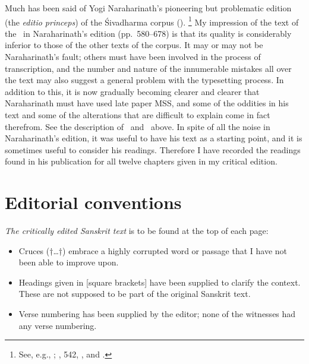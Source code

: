 Much has been said of Yogi Naraharinath's pioneering
but problematic edition (the \emph{editio princeps}) 
of the Śivadharma corpus 
().%
			\footnote{See, e.g.,
;
\citeyear{DeSiminiLachmann2017}, 542,
, and
.}
My impression of the text of the \VSS\ in 
Naraharinath's edition (pp.~580--678) is that its quality is
considerably inferior to those of the other texts of the corpus.
It may or may not be Naraharinath's fault; 
others must have been involved in the process of transcription, and the number and nature of the innumerable mistakes all over the text may also suggest a general problem with the typesetting process. In addition to this, it is now 
gradually becoming clearer and clearer that
Naraharinath must have used late paper MSS, and
some of the oddities in his text and some of the
alterations that are difficult to explain come in fact
therefrom. See the description of \msPaperA\ and
\msPaperC\ above.
In spite of all the noise in Naraharinath's edition, it
was useful to have his text as a starting point, and it
is sometimes useful to consider his readings.
Therefore I have recorded the readings found in his
publication for all twelve chapters given in my critical edition.


\vfill
\pagebreak


\section{Editorial conventions}


\textit{The critically edited Sanskrit text} is to be found at the top of each page:

\begin{itemize}
\item Cruces (†{\dots}†) embrace a highly corrupted word or passage
        that I have not been able to improve upon.


\item Headings given in [square brackets] have been supplied to clarify the context. 
        These are not supposed to be part of the original Sanskrit text.

\item Verse numbering has been supplied by the editor; none of the witnesses had any verse numbering.
\end{itemize}

